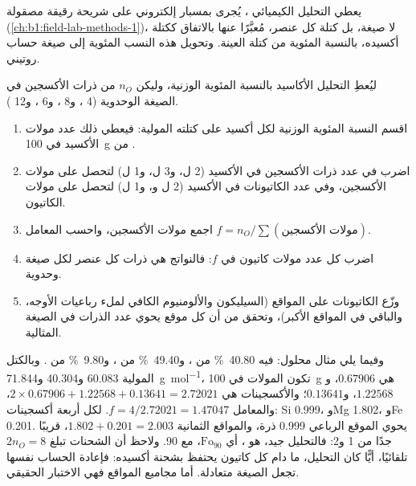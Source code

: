 يعطي التحليل الكيميائي ، يُجرى بمسبار إلكتروني على شريحة رقيقة مصقولة (\cref{ch:b1:field-lab-methods-1})، لا صيغة، بل كتلة كل عنصر، مُعبَّرًا عنها بالاتفاق ككتلة أكسيده، بالنسبة المئوية من كتلة العينة. وتحويل هذه النسب المئوية إلى صيغة حساب روتيني.

\begin{method}\label{met:b1:rock-forming-minerals:recalculation}
ليُعطِ التحليل الأكاسيد بالنسبة المئوية الوزنية، وليكن  $n_O$ من ذرات الأكسجين في الصيغة الوحدوية (4 ، و\num{8} ، و\num{6} ، و\num{12} ).
\begin{enumerate}
  \item اقسم النسبة المئوية الوزنية لكل أكسيد على كتلته المولية: فيعطي ذلك عدد مولات الأكسيد في \qty{100}{g} من .
  \item اضرب في عدد ذرات الأكسجين في الأكسيد (2 ل، و\num{3} ل، و\num{1} ل) لتحصل على مولات الأكسجين، وفي عدد الكاتيونات في الأكسيد (2 ل و، و\num{1} ل) لتحصل على مولات الكاتيون.
  \item اجمع مولات الأكسجين، واحسب المعامل $f = n_O / \sum(\text{مولات الأكسجين})$.
  \item اضرب كل عدد مولات كاتيون في $f$: فالنواتج هي ذرات كل عنصر لكل صيغة وحدوية.
  \item وزّع الكاتيونات على المواقع (السيليكون والألومنيوم الكافي لملء رباعيات الأوجه، والباقي في المواقع الأكبر)، وتحقق من أن كل موقع يحوي عدد الذرات في الصيغة المثالية.
\end{enumerate}
\end{method}

وفيما يلي مثال محلول:  فيه \qty{40.80}{\percent} من ، و\qty{49.40}{\percent} من ، و\qty{9.80}{\percent} من . وبالكتل المولية \num{60.083} و\num{40.304} و\qty{71.844}{g.mol^{-1}}، تكون المولات في \qty{100}{g} هي $0.67906$، و$1.22568$، و$0.13641$؛ والأكسجينات هي $2\times0.67906 + 1.22568 + 0.13641 = 2.72021$، والمعامل $f = 4/2.72021 = 1.47047$. لكل أربعة أكسجينات: Si \num{0.999}، وMg \num{1.802}، وFe \num{0.201}. يحوي الموقع الرباعي \num{0.999} ذرة، والمواقع الثمانية $1.802 + 0.201 = 2.003$، قريبًا جدًا من 1 و\num{2}: فالتحليل جيد،  هو ، أي $\text{Fo}_{90}$، مع  90. ولاحظ أن الشحنات تبلغ $2n_O = 8$ تلقائيًا، أيًّا كان التحليل، ما دام كل كاتيون يحتفظ بشحنة أكسيده: فإعادة الحساب نفسها تجعل الصيغة متعادلة. أما مجاميع المواقع فهي الاختبار الحقيقي.

